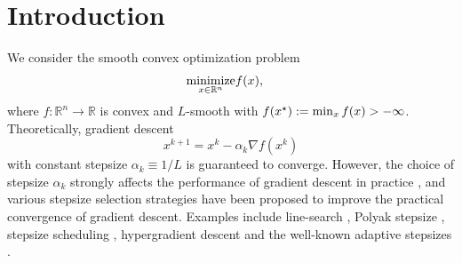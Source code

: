 \section{Introduction}\label{sec:intro}

We consider the smooth convex optimization problem
\begin{eqnarray*}
  \underset{x \in \mathbb{R}^n}{\text{minimize}} & f (x), & 
\end{eqnarray*}
where $f : \mathbb{R}^n \rightarrow \mathbb{R}$ is convex and $L$-smooth with $f
(x^{\star}) := \min_x f (x) > - \infty$. Theoretically, gradient descent
\begin{equation*}%
	x^{k+1} = x^k - \alpha_k \nabla f(x^k)
\end{equation*}
 with constant stepsize $\alpha_k \equiv 1/L$ is guaranteed to converge. However, the choice of stepsize $\alpha_k$ strongly affects the performance of gradient descent in practice \cite{defazio2024road}, and various stepsize selection strategies have been proposed to improve the practical convergence of gradient descent. Examples include line-search \cite{armijo1966minimization}, Polyak stepsize \cite{polyak1987introduction}, stepsize scheduling  \cite{li2021second, wang2023convergence}, hypergradient descent \cite{almeida1999parameter,rubio2017convergence,gunes2018online} and  the well-known adaptive stepsizes \cite{orabona2016coin,duchi2011adaptive,kingma2014adam}.

